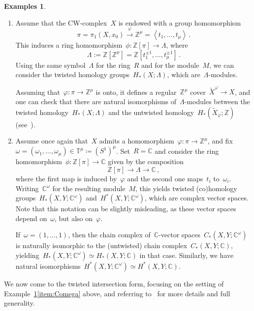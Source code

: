 \documentclass{amsart}
\newcommand{\Z}{\mathbb{Z}}
\newcommand{\C}{\mathbb{C}}
\newcommand{\T}{\mathbb{T}}
\theoremstyle{definition}
\newtheorem{exs}[thm]{Examples}
\theoremstyle{remark}
\begin{document}
\begin{exs}
\label{exs:twisted}
\begin{enumerate}
\item\label{exs:twisted-1} Assume that the CW-complex~$X$ is endowed with a group homomorphism
\[
\pi=\pi_1(X,x_0)\stackrel{\varphi}{\longrightarrow}\Z^\mu=\left<t_1,\dots,t_\mu\right>\,.
\]
This induces a ring homomorphism~$\phi\colon\Z[\pi]\to\Lambda$, where
\[
\Lambda:=\Z[\Z^\mu]=\Z[t_1^{\pm 1},\dots,t_\mu^{\pm 1}]\,.
\]
Using the same symbol~$\Lambda$ for the ring~$R$ and for the module~$M$, we
can consider the twisted homology groups~$H_*(X;\Lambda)$, which are~$\Lambda$-modules.

Assuming that~$\varphi\colon\pi\to\Z^\mu$ is onto, it defines a regular~$\Z^\mu$ cover~$\widetilde{X}^\varphi\to X$,
and one can check that there are natural isomorphisms of~$\Lambda$-modules between the
twisted homology~$H_*(X;\Lambda)$ and the untwisted homology~$H_*(\widetilde{X}_\varphi;\Z)$ (see~\cite[Proposition~239.2]{Friedl}).

\item\label{item:Comega} Assume once again that~$X$ admits a homomorphism~$\varphi\colon\pi\to\Z^\mu$, and fix~$\omega=(\omega_1,\dots,\omega_\mu)\in\T^\mu\coloneq(S^1)^\mu$. Set~$R=\C$ and consider the ring homomorphism~$\phi\colon\Z[\pi]\to\C$ given by the
composition
\[
\Z[\pi]{\longrightarrow}\Lambda{\longrightarrow}\C\,,
\]
where the first map is induced by~$\varphi$ and the second one maps~$t_i$ to~$\omega_i$. Writing~$\C^\omega$ for the resulting module~$M$, this yields twisted (co)homology groups~$H_*(X,Y;\C^\omega)$ and~$H^*(X,Y;\C^\omega)$, which are complex vector spaces. Note that this notation can be slightly misleading, as these vector spaces depend on~$\omega$, but also on~$\varphi$.

If~$\omega=(1,\dots,1)$, then the chain complex of~$\C$-vector spaces~$C_*(X,Y;\C^\omega)$
is naturally isomorphic to the (untwisted) chain complex~$C_*(X,Y;\C)$, yielding~$H_*(X,Y;\C^\omega)\simeq H_*(X,Y;\C)$ in that case. Similarly, we have natural isomorphisms~$H^*(X,Y;\C^\omega)\simeq H^*(X,Y;\C)$.
\end{enumerate}
\end{exs}


We now come to the twisted intersection form, focusing on the setting of Example~\ref{exs:twisted}\ref{item:Comega} above, and 
referring to~\cite[Chapter~244]{Friedl} for more details and full generality.
\end{document}
